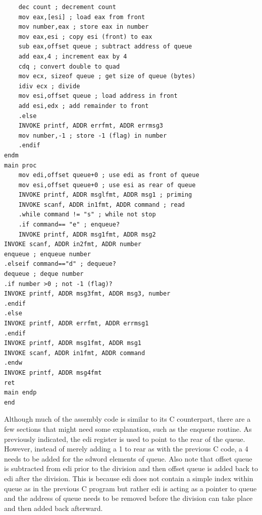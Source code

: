 \documentclass[10pt]{book}
\begin{document}
\begin{center}
\begin{center}
\begin{center}
\begin{verbatim}
    dec count ; decrement count
    mov eax,[esi] ; load eax from front
    mov number,eax ; store eax in number
    mov eax,esi ; copy esi (front) to eax
    sub eax,offset queue ; subtract address of queue
    add eax,4 ; increment eax by 4
    cdq ; convert double to quad
    mov ecx, sizeof queue ; get size of queue (bytes)
    idiv ecx ; divide
    mov esi,offset queue ; load address in front
    add esi,edx ; add remainder to front
    .else
    INVOKE printf, ADDR errfmt, ADDR errmsg3
    mov number,-1 ; store -1 (flag) in number
    .endif
endm
main proc
    mov edi,offset queue+0 ; use edi as front of queue
    mov esi,offset queue+0 ; use esi as rear of queue
    INVOKE printf, ADDR msglfmt, ADDR msg1 ; priming
    INVOKE scanf, ADDR in1fmt, ADDR command ; read
    .while command != "s" ; while not stop
    .if command== "e" ; enqueue?
    INVOKE printf, ADDR msg1fmt, ADDR msg2
INVOKE scanf, ADDR in2fmt, ADDR number
enqueue ; enqueue number
.elseif command=="d" ; dequeue?
dequeue ; deque number
.if number >0 ; not -1 (flag)?
INVOKE printf, ADDR msg3fmt, ADDR msg3, number
.endif
.else
INVOKE printf, ADDR errfmt, ADDR errmsg1
.endif
INVOKE printf, ADDR msg1fmt, ADDR msg1
INVOKE scanf, ADDR in1fmt, ADDR command
.endw
INVOKE printf, ADDR msg4fmt
ret
main endp
end
\end{verbatim}

Although much of the assembly code is similar to its C counterpart, there are a few sections that might need some explanation, such as the enqueue routine. As previously indicated, the edi register is used to point to the rear of the queue. However, instead of merely adding a 1 to rear as with the previous C code, a 4\\

needs to be added for the sdword elements of queue. Also note that offset queue is subtracted from edi prior to the division and then offset queue is added back to edi after the division. This is because edi does not contain a simple index within queue as in the previous C program but rather edi is acting as a pointer to queue and the address of queue needs to be removed before the division can take place and then added back afterward.



\end{center}
\end{center}
\end{center}
\end{document}
